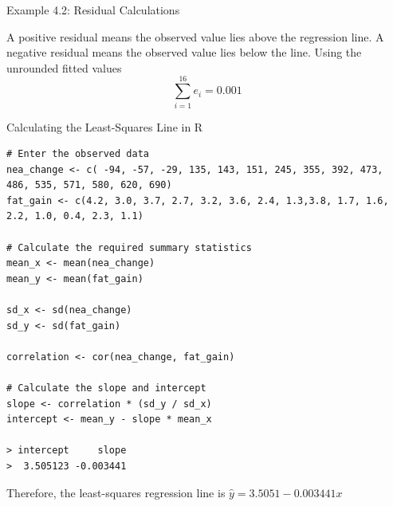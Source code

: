 \documentclass[aspectratio=169]{beamer}
\begin{document}
\begin{frame}{Example 4.2: Residual Calculations}
\vspace{0.2cm}

A positive residual means the observed value lies above the regression line. A negative residual means the observed value lies below the line. Using the unrounded fitted values
$$\sum_{i=1}^{16} e_i = 0.001$$
\end{frame}

\begin{frame}[fragile]{Calculating the Least-Squares Line in R}
\scriptsize
\begin{verbatim}
# Enter the observed data
nea_change <- c( -94, -57, -29, 135, 143, 151, 245, 355, 392, 473, 486, 535, 571, 580, 620, 690)
fat_gain <- c(4.2, 3.0, 3.7, 2.7, 3.2, 3.6, 2.4, 1.3,3.8, 1.7, 1.6, 2.2, 1.0, 0.4, 2.3, 1.1)

# Calculate the required summary statistics
mean_x <- mean(nea_change)
mean_y <- mean(fat_gain)

sd_x <- sd(nea_change)
sd_y <- sd(fat_gain)

correlation <- cor(nea_change, fat_gain)

# Calculate the slope and intercept
slope <- correlation * (sd_y / sd_x)
intercept <- mean_y - slope * mean_x

> intercept     slope
>  3.505123 -0.003441
\end{verbatim}

Therefore, the least-squares regression line is
$\boxed{\hat{y}=3.5051-0.003441x}$
\end{frame}
\end{document}
